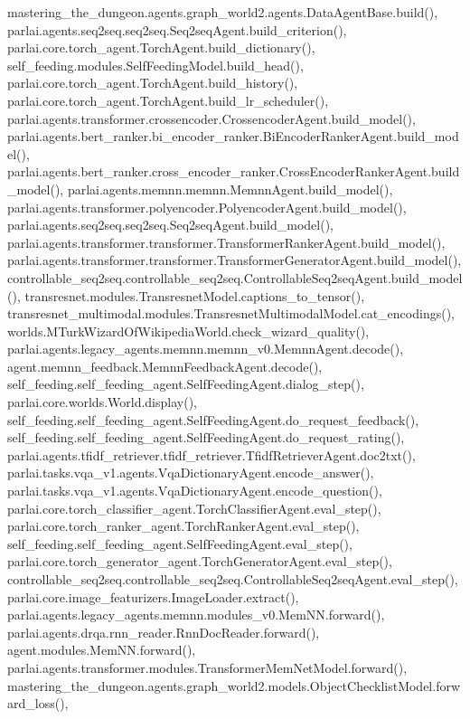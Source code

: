 mastering\+\_\+the\+\_\+dungeon.\+agents.\+graph\+\_\+world2.\+agents.\+Data\+Agent\+Base.\+build(), parlai.\+agents.\+seq2seq.\+seq2seq.\+Seq2seq\+Agent.\+build\+\_\+criterion(), parlai.\+core.\+torch\+\_\+agent.\+Torch\+Agent.\+build\+\_\+dictionary(), self\+\_\+feeding.\+modules.\+Self\+Feeding\+Model.\+build\+\_\+head(), parlai.\+core.\+torch\+\_\+agent.\+Torch\+Agent.\+build\+\_\+history(), parlai.\+core.\+torch\+\_\+agent.\+Torch\+Agent.\+build\+\_\+lr\+\_\+scheduler(), parlai.\+agents.\+transformer.\+crossencoder.\+Crossencoder\+Agent.\+build\+\_\+model(), parlai.\+agents.\+bert\+\_\+ranker.\+bi\+\_\+encoder\+\_\+ranker.\+Bi\+Encoder\+Ranker\+Agent.\+build\+\_\+model(), parlai.\+agents.\+bert\+\_\+ranker.\+cross\+\_\+encoder\+\_\+ranker.\+Cross\+Encoder\+Ranker\+Agent.\+build\+\_\+model(), parlai.\+agents.\+memnn.\+memnn.\+Memnn\+Agent.\+build\+\_\+model(), parlai.\+agents.\+transformer.\+polyencoder.\+Polyencoder\+Agent.\+build\+\_\+model(), parlai.\+agents.\+seq2seq.\+seq2seq.\+Seq2seq\+Agent.\+build\+\_\+model(), parlai.\+agents.\+transformer.\+transformer.\+Transformer\+Ranker\+Agent.\+build\+\_\+model(), parlai.\+agents.\+transformer.\+transformer.\+Transformer\+Generator\+Agent.\+build\+\_\+model(), controllable\+\_\+seq2seq.\+controllable\+\_\+seq2seq.\+Controllable\+Seq2seq\+Agent.\+build\+\_\+model(), transresnet.\+modules.\+Transresnet\+Model.\+captions\+\_\+to\+\_\+tensor(), transresnet\+\_\+multimodal.\+modules.\+Transresnet\+Multimodal\+Model.\+cat\+\_\+encodings(), worlds.\+M\+Turk\+Wizard\+Of\+Wikipedia\+World.\+check\+\_\+wizard\+\_\+quality(), parlai.\+agents.\+legacy\+\_\+agents.\+memnn.\+memnn\+\_\+v0.\+Memnn\+Agent.\+decode(), agent.\+memnn\+\_\+feedback.\+Memnn\+Feedback\+Agent.\+decode(), self\+\_\+feeding.\+self\+\_\+feeding\+\_\+agent.\+Self\+Feeding\+Agent.\+dialog\+\_\+step(), parlai.\+core.\+worlds.\+World.\+display(), self\+\_\+feeding.\+self\+\_\+feeding\+\_\+agent.\+Self\+Feeding\+Agent.\+do\+\_\+request\+\_\+feedback(), self\+\_\+feeding.\+self\+\_\+feeding\+\_\+agent.\+Self\+Feeding\+Agent.\+do\+\_\+request\+\_\+rating(), parlai.\+agents.\+tfidf\+\_\+retriever.\+tfidf\+\_\+retriever.\+Tfidf\+Retriever\+Agent.\+doc2txt(), parlai.\+tasks.\+vqa\+\_\+v1.\+agents.\+Vqa\+Dictionary\+Agent.\+encode\+\_\+answer(), parlai.\+tasks.\+vqa\+\_\+v1.\+agents.\+Vqa\+Dictionary\+Agent.\+encode\+\_\+question(), parlai.\+core.\+torch\+\_\+classifier\+\_\+agent.\+Torch\+Classifier\+Agent.\+eval\+\_\+step(), parlai.\+core.\+torch\+\_\+ranker\+\_\+agent.\+Torch\+Ranker\+Agent.\+eval\+\_\+step(), self\+\_\+feeding.\+self\+\_\+feeding\+\_\+agent.\+Self\+Feeding\+Agent.\+eval\+\_\+step(), parlai.\+core.\+torch\+\_\+generator\+\_\+agent.\+Torch\+Generator\+Agent.\+eval\+\_\+step(), controllable\+\_\+seq2seq.\+controllable\+\_\+seq2seq.\+Controllable\+Seq2seq\+Agent.\+eval\+\_\+step(), parlai.\+core.\+image\+\_\+featurizers.\+Image\+Loader.\+extract(), parlai.\+agents.\+legacy\+\_\+agents.\+memnn.\+modules\+\_\+v0.\+Mem\+N\+N.\+forward(), parlai.\+agents.\+drqa.\+rnn\+\_\+reader.\+Rnn\+Doc\+Reader.\+forward(), agent.\+modules.\+Mem\+N\+N.\+forward(), parlai.\+agents.\+transformer.\+modules.\+Transformer\+Mem\+Net\+Model.\+forward(), mastering\+\_\+the\+\_\+dungeon.\+agents.\+graph\+\_\+world2.\+models.\+Object\+Checklist\+Model.\+forward\+\_\+loss(), 